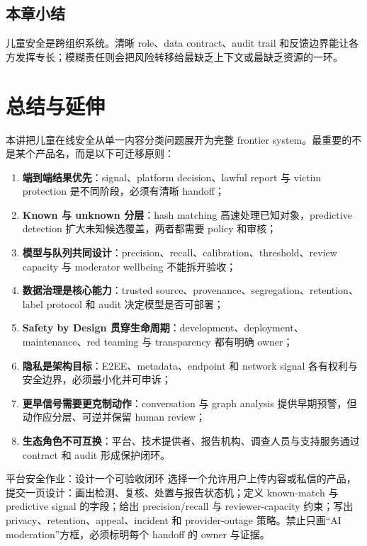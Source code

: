 \documentclass[a4paper]{article}
\begin{document}

\subsection{本章小结}

儿童安全是跨组织系统。清晰 role、data contract、audit trail 和反馈边界能让各方发挥专长；模糊责任则会把风险转移给最缺乏上下文或最缺乏资源的一环。

\section{总结与延伸}

本讲把儿童在线安全从单一内容分类问题展开为完整 frontier system。最重要的不是某个产品名，而是以下可迁移原则：

\begin{enumerate}
  \item \textbf{端到端结果优先}：signal、platform decision、lawful report 与 victim protection 是不同阶段，必须有清晰 handoff；
  \item \textbf{Known 与 unknown 分层}：hash matching 高速处理已知对象，predictive detection 扩大未知候选覆盖，两者都需要 policy 和审核；
  \item \textbf{模型与队列共同设计}：precision、recall、calibration、threshold、review capacity 与 moderator wellbeing 不能拆开验收；
  \item \textbf{数据治理是核心能力}：trusted source、provenance、segregation、retention、label protocol 和 audit 决定模型是否可部署；
  \item \textbf{Safety by Design 贯穿生命周期}：development、deployment、maintenance、red teaming 与 transparency 都有明确 owner；
  \item \textbf{隐私是架构目标}：E2EE、metadata、endpoint 和 network signal 各有权利与安全边界，必须最小化并可申诉；
  \item \textbf{更早信号需要更克制动作}：conversation 与 graph analysis 提供早期预警，但动作应分层、可逆并保留 human review；
  \item \textbf{生态角色不可互换}：平台、技术提供者、报告机构、调查人员与支持服务通过 contract 和 audit 形成保护闭环。
\end{enumerate}

\begin{importantbox}{平台安全作业：设计一个可验收闭环}
选择一个允许用户上传内容或私信的产品，提交一页设计：画出检测、复核、处置与报告状态机；定义 known-match 与 predictive signal 的字段；给出 precision/recall 与 reviewer-capacity 约束；写出 privacy、retention、appeal、incident 和 provider-outage 策略。禁止只画“AI moderation”方框，必须标明每个 handoff 的 owner 与证据。
\end{importantbox}
\end{document}
